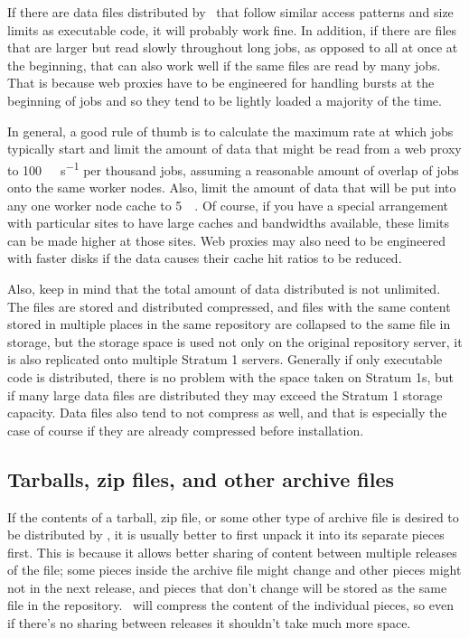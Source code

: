 If there are data files distributed by \cvmfs\ that follow similar access patterns and size limits as executable code, it will probably work fine.
In addition, if there are files that are larger but read slowly throughout long jobs, as opposed to all at once at the beginning, that can also work well if the same files are read by many jobs.
That is because web proxies have to be engineered for handling bursts at the beginning of jobs and so they tend to be lightly loaded a majority of the time.

In general, a good rule of thumb is to calculate the maximum rate at which jobs typically start and limit the amount of data that might be read from a web proxy to \SI{100}{\mega\byte\per\second} per thousand jobs, assuming a reasonable amount of overlap of jobs onto the same worker nodes.
Also, limit the amount of data that will be put into any one worker node cache to \SI{5}{\giga\byte}.
Of course, if you have a special arrangement with particular sites to have large caches and bandwidths available, these limits can be made higher at those sites.
Web proxies may also need to be engineered with faster disks if the data causes their cache hit ratios to be reduced.

Also, keep in mind that the total amount of data distributed is not unlimited.
The files are stored and distributed compressed, and files with the same content stored in multiple places in the same repository are collapsed to the same file in storage, but the storage space is used not only on the original repository server, it is also replicated onto multiple Stratum 1 servers.
Generally if only executable code is distributed, there is no problem with the space taken on Stratum 1s, but if many large data files are distributed they may exceed the Stratum 1
storage capacity.
Data files also tend to not compress as well, and that is especially the case of course if they are already compressed before installation.

\subsection{Tarballs, zip files, and other archive files}
If the contents of a tarball, zip file, or some other type of archive file is desired to be distributed by \cvmfs, it is usually better to first unpack it into its separate pieces first.
This is because it allows better sharing of content between multiple releases of the file;
some pieces inside the archive file might change and other pieces might not in the next release, and pieces that don't change will be stored as the same file in the repository.
\cvmfs\ will compress the content of the individual pieces, so even if there's no sharing between releases it shouldn't take much more space.

